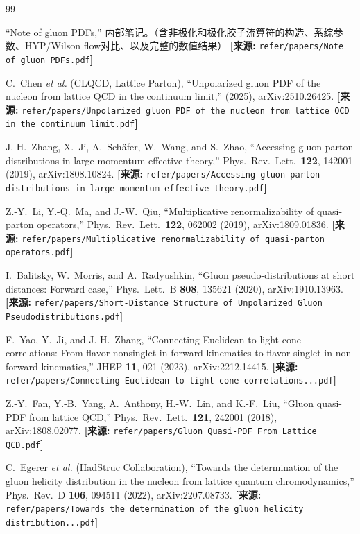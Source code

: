 \documentclass[12pt,a4paper]{ctexart}
\theoremstyle{definition}
\begin{document}
\begin{thebibliography}{99}

``Note of gluon PDFs,''
内部笔记。（含非极化和极化胶子流算符的构造、系综参数、HYP/Wilson flow对比、以及完整的数值结果）
\quad\textbf{[来源:} \texttt{refer/papers/Note of gluon PDFs.pdf}\textbf{]}

C.~Chen \textit{et al.} (CLQCD, Lattice Parton),
``Unpolarized gluon PDF of the nucleon from lattice QCD in the continuum limit,''
(2025), arXiv:2510.26425.
\quad\textbf{[来源:} \texttt{refer/papers/Unpolarized gluon PDF of the nucleon from lattice QCD in the continuum limit.pdf}\textbf{]}

J.-H.~Zhang, X.~Ji, A.~Sch\"afer, W.~Wang, and S.~Zhao,
``Accessing gluon parton distributions in large momentum effective theory,''
Phys.\ Rev.\ Lett.\ \textbf{122}, 142001 (2019), arXiv:1808.10824.
\quad\textbf{[来源:} \texttt{refer/papers/Accessing gluon parton distributions in large momentum effective theory.pdf}\textbf{]}

Z.-Y.~Li, Y.-Q.~Ma, and J.-W.~Qiu,
``Multiplicative renormalizability of quasi-parton operators,''
Phys.\ Rev.\ Lett.\ \textbf{122}, 062002 (2019), arXiv:1809.01836.
\quad\textbf{[来源:} \texttt{refer/papers/Multiplicative renormalizability of quasi-parton operators.pdf}\textbf{]}

I.~Balitsky, W.~Morris, and A.~Radyushkin,
``Gluon pseudo-distributions at short distances: Forward case,''
Phys.\ Lett.\ B \textbf{808}, 135621 (2020), arXiv:1910.13963.
\quad\textbf{[来源:} \texttt{refer/papers/Short-Distance Structure of Unpolarized Gluon Pseudodistributions.pdf}\textbf{]}

F.~Yao, Y.~Ji, and J.-H.~Zhang,
``Connecting Euclidean to light-cone correlations: From flavor nonsinglet in forward kinematics to flavor singlet in non-forward kinematics,''
JHEP \textbf{11}, 021 (2023), arXiv:2212.14415.
\quad\textbf{[来源:} \texttt{refer/papers/Connecting Euclidean to light-cone correlations...pdf}\textbf{]}

Z.-Y.~Fan, Y.-B.~Yang, A.~Anthony, H.-W.~Lin, and K.-F.~Liu,
``Gluon quasi-PDF from lattice QCD,''
Phys.\ Rev.\ Lett.\ \textbf{121}, 242001 (2018), arXiv:1808.02077.
\quad\textbf{[来源:} \texttt{refer/papers/Gluon Quasi-PDF From Lattice QCD.pdf}\textbf{]}

C.~Egerer \textit{et al.} (HadStruc Collaboration),
``Towards the determination of the gluon helicity distribution in the nucleon from lattice quantum chromodynamics,''
Phys.\ Rev.\ D \textbf{106}, 094511 (2022), arXiv:2207.08733.
\quad\textbf{[来源:} \texttt{refer/papers/Towards the determination of the gluon helicity distribution...pdf}\textbf{]}


\end{thebibliography}
\end{document}
